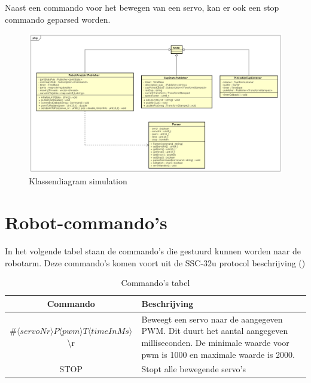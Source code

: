 \documentclass[12pt, legalpaper]{article}
\begin{document}
    Naast een commando voor het bewegen van een servo, kan er ook een stop commando geparsed worden.

    \begin{figure}
        \includegraphics[width=1\textwidth]{KlassenDiagramSimulation}
        \caption{Klassendiagram simulation}
        \label{fig:classdiagram}
    \end{figure}

    \newpage

    \section{Robot-commando's}
    \label{commands}
    In het volgende tabel staan de commando's die gestuurd kunnen worden naar de robotarm.
    Deze commando's komen voort uit de SSC-32u protocol beschrijving (\cite{lynxmoti36:online})

    \begin{table}[h]
        \begin{tabularx}{1\textwidth} {|c|X|}
            \hline
            \textbf{Commando} & \textbf{Beschrijving}\\
            \hline\hline
            $\#\langle servoNr\rangle P\langle pwm \rangle T\langle time In Ms \rangle$\textbackslash r & Beweegt een servo naar de aangegeven PWM. Dit duurt het aantal aangegeven milliseconden. De minimale waarde voor pwm is 1000 en maximale waarde is 2000.\\
            \hline
            STOP & Stopt alle bewegende servo's\\
            \hline
        \end{tabularx}
        \caption{Commando's tabel}
        \label{tab:commands}
    \end{table}

    \printbibliography
    
\end{document}
